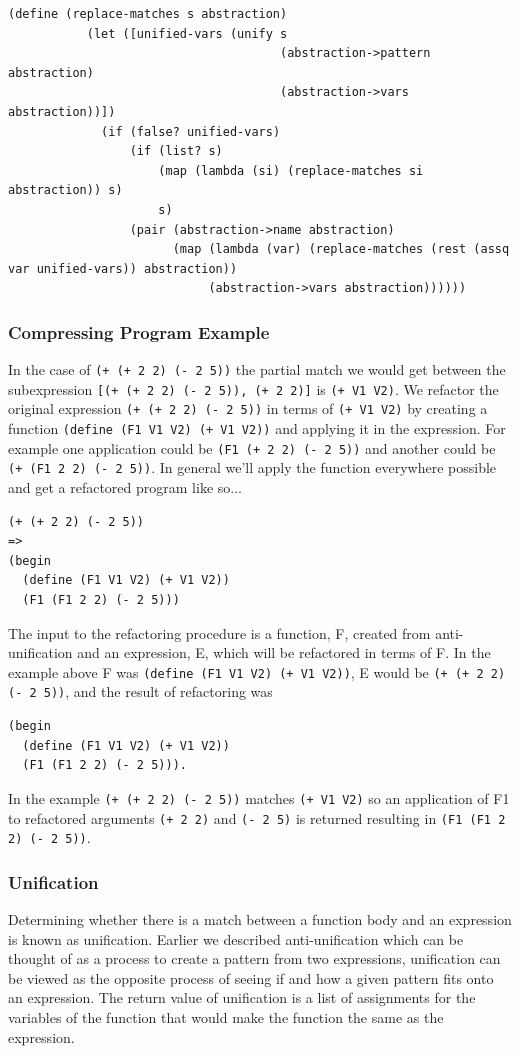 \documentclass[a4paper,10pt]{article}
\begin{document}
\begin{lstlisting}[frame=trBL]
(define (replace-matches s abstraction)
           (let ([unified-vars (unify s
                                      (abstraction->pattern abstraction)
                                      (abstraction->vars abstraction))])
             (if (false? unified-vars)
                 (if (list? s)
                     (map (lambda (si) (replace-matches si abstraction)) s)
                     s)
                 (pair (abstraction->name abstraction)
                       (map (lambda (var) (replace-matches (rest (assq var unified-vars)) abstraction))
                            (abstraction->vars abstraction))))))
\end{lstlisting}
\subsubsection{Compressing Program Example}
In the case of \texttt{(+ (+ 2 2) (- 2 5))} the partial match we would get between the subexpression \texttt{[(+ (+ 2 2) (- 2 5)), (+ 2 2)]} is \texttt{(+ V1 V2)}.  We refactor the original expression \texttt{(+ (+ 2 2) (- 2 5))} in terms of \texttt{(+ V1 V2)} by creating a function \texttt{(define (F1 V1 V2) (+ V1 V2))} and applying it in the expression.  For example one application could be \texttt{(F1 (+ 2 2) (- 2 5))} and another could be \texttt{(+ (F1 2 2) (- 2 5))}.  In general we'll apply the function everywhere possible and get a refactored program like so...
\begin{lstlisting}
(+ (+ 2 2) (- 2 5))
=>
(begin
  (define (F1 V1 V2) (+ V1 V2))
  (F1 (F1 2 2) (- 2 5)))
\end{lstlisting}
The input to the refactoring procedure is a function, F, created from anti-unification and an expression, E, which will be refactored in terms of F.  In the example above F was \texttt{(define (F1 V1 V2) (+ V1 V2))}, E would be \texttt{(+ (+ 2 2) (- 2 5))}, and the result of refactoring was 
\begin{lstlisting}
(begin
  (define (F1 V1 V2) (+ V1 V2))
  (F1 (F1 2 2) (- 2 5))).
\end{lstlisting}

In the example \texttt{(+ (+ 2 2) (- 2 5))} matches \texttt{(+ V1 V2)} so an application of F1 to refactored arguments \texttt{(+ 2 2)} and \texttt{(- 2 5)} is returned resulting in \texttt{(F1 (F1 2 2) (- 2 5))}.  


\subsubsection{Unification}
Determining whether there is a match between a function body and an expression is known as unification.  Earlier we described anti-unification which can be thought of as a process to create a pattern from two expressions, unification can be viewed as the opposite process of seeing if and how a given pattern fits onto an expression.  The return value of unification is a list of assignments for the variables of the function that would make the function the same as the expression.
\end{document}
